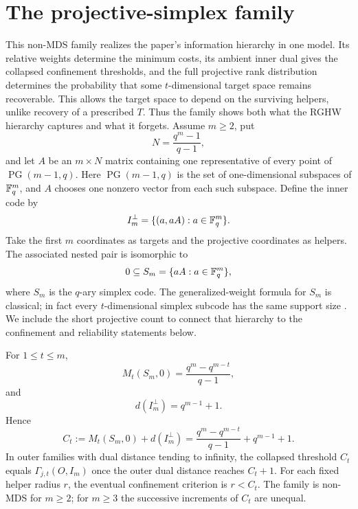\section{The projective-simplex family}
\label{sec:projective-simplex}

This non-MDS family realizes the paper's information hierarchy in one model.
Its relative weights determine the minimum costs, its ambient inner dual gives
the collapsed confinement thresholds, and the full projective rank distribution
determines the probability that some $t$-dimensional target space remains
recoverable.  This allows the target space to depend on the surviving helpers,
unlike recovery of a prescribed $T$.  Thus the family shows both what the RGHW hierarchy
captures and what it forgets.
Assume $m\geq2$, put
\[
 N=\frac{q^m-1}{q-1},
\]
and let $A$ be an $m\times N$ matrix containing one representative of every
point of $\operatorname{PG}(m-1,q)$.  Here
$\operatorname{PG}(m-1,q)$ is the set of one-dimensional subspaces of
$\mathbb F_q^m$, and $A$ chooses one nonzero vector from each such subspace.  Define
the inner code by
\begin{equation}
 I_m^\perp=\{(a,aA):a\in\mathbb F_q^m\}.
 \label{eq:projective-inner-dual}
\end{equation}
Take the first $m$ coordinates as targets and the projective coordinates as
helpers.  The associated nested pair is isomorphic to
\[
 0\subseteq S_m=\{aA:a\in\mathbb F_q^m\},
\]
where $S_m$ is the $q$-ary simplex code.
The generalized-weight formula for $S_m$ is classical; in fact every
$t$-dimensional simplex subcode has the same support size
\cite{PanEtAl2024}.  We include the short projective count to connect that
hierarchy to the confinement and reliability statements below.

\begin{theorem}
\label{thm:projective-thresholds}
%
For $1\leq t\leq m$,
\begin{equation}
 M_t(S_m,0)=\frac{q^m-q^{m-t}}{q-1},
 \label{eq:simplex-weights}
\end{equation}
and
\begin{equation}
 d(I_m^\perp)=q^{m-1}+1.
 \label{eq:projective-dual-distance}
\end{equation}
Hence
\begin{equation}
 C_t:=M_t(S_m,0)+d(I_m^\perp)
 =\frac{q^m-q^{m-t}}{q-1}+q^{m-1}+1.
 \label{eq:projective-thresholds}
\end{equation}
In outer families with dual distance tending to infinity, the collapsed
threshold $C_t$ equals $\Gamma_{j,t}(O,I_m)$ once the outer dual distance
reaches $C_t+1$.  For each fixed helper radius $r$, the eventual
confinement criterion is $r<C_t$.
The family is non-MDS for $m\geq2$; for $m\geq3$ the successive increments
of $C_t$ are unequal.
\end{theorem}

